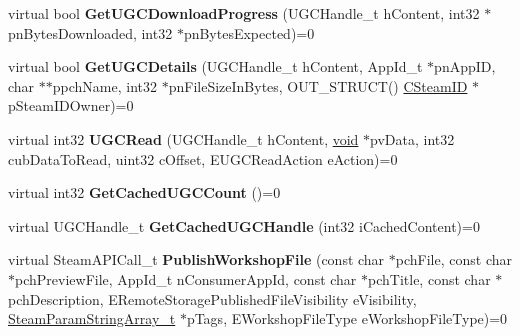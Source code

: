 \begin{DoxyCompactItemize}
\item 
\hypertarget{classISteamRemoteStorage_a9402ae508e9d3ab378b0314c26902857}{}virtual bool {\bfseries Get\+U\+G\+C\+Download\+Progress} (U\+G\+C\+Handle\+\_\+t h\+Content, int32 $\ast$pn\+Bytes\+Downloaded, int32 $\ast$pn\+Bytes\+Expected)=0\label{classISteamRemoteStorage_a9402ae508e9d3ab378b0314c26902857}

\item 
\hypertarget{classISteamRemoteStorage_a1ae63216416d4ab5bdbfa2a173531d05}{}virtual bool {\bfseries Get\+U\+G\+C\+Details} (U\+G\+C\+Handle\+\_\+t h\+Content, App\+Id\+\_\+t $\ast$pn\+App\+I\+D, char $\ast$$\ast$ppch\+Name, int32 $\ast$pn\+File\+Size\+In\+Bytes, O\+U\+T\+\_\+\+S\+T\+R\+U\+C\+T() \hyperlink{classCSteamID}{C\+Steam\+I\+D} $\ast$p\+Steam\+I\+D\+Owner)=0\label{classISteamRemoteStorage_a1ae63216416d4ab5bdbfa2a173531d05}

\item 
\hypertarget{classISteamRemoteStorage_a73d9a54a3d8499a131c5a6a6458d51ac}{}virtual int32 {\bfseries U\+G\+C\+Read} (U\+G\+C\+Handle\+\_\+t h\+Content, \hyperlink{SDL__audio_8h_a52835ae37c4bb905b903cbaf5d04b05f}{void} $\ast$pv\+Data, int32 cub\+Data\+To\+Read, uint32 c\+Offset, E\+U\+G\+C\+Read\+Action e\+Action)=0\label{classISteamRemoteStorage_a73d9a54a3d8499a131c5a6a6458d51ac}

\item 
\hypertarget{classISteamRemoteStorage_ac0d333da8fd008d449724882bb80a3df}{}virtual int32 {\bfseries Get\+Cached\+U\+G\+C\+Count} ()=0\label{classISteamRemoteStorage_ac0d333da8fd008d449724882bb80a3df}

\item 
\hypertarget{classISteamRemoteStorage_ae12669aa7bce9279b5c25938bd350a0f}{}virtual U\+G\+C\+Handle\+\_\+t {\bfseries Get\+Cached\+U\+G\+C\+Handle} (int32 i\+Cached\+Content)=0\label{classISteamRemoteStorage_ae12669aa7bce9279b5c25938bd350a0f}

\item 
\hypertarget{classISteamRemoteStorage_aff57828f414ca927cc35317271222c49}{}virtual Steam\+A\+P\+I\+Call\+\_\+t {\bfseries Publish\+Workshop\+File} (const char $\ast$pch\+File, const char $\ast$pch\+Preview\+File, App\+Id\+\_\+t n\+Consumer\+App\+Id, const char $\ast$pch\+Title, const char $\ast$pch\+Description, E\+Remote\+Storage\+Published\+File\+Visibility e\+Visibility, \hyperlink{structSteamParamStringArray__t}{Steam\+Param\+String\+Array\+\_\+t} $\ast$p\+Tags, E\+Workshop\+File\+Type e\+Workshop\+File\+Type)=0\label{classISteamRemoteStorage_aff57828f414ca927cc35317271222c49}


\end{DoxyCompactItemize}

